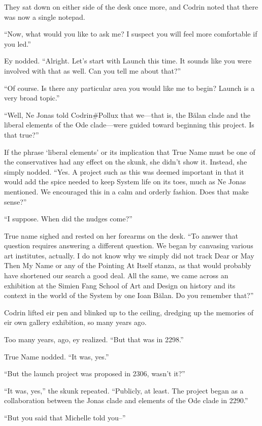 They sat down on either side of the desk once more, and Codrin noted that there was now a single notepad.

``Now, what would you like to ask me? I suspect you will feel more comfortable if you led.''

Ey nodded. ``Alright. Let's start with Launch this time. It sounds like you were involved with that as well. Can you tell me about that?''

``Of course. Is there any particular area you would like me to begin? Launch is a very broad topic.''

``Well, Ne Jonas told Codrin\#Pollux that we---that is, the Bălan clade and the liberal elements of the Ode clade---were guided toward beginning this project. Is that true?''

If the phrase `liberal elements' or its implication that True Name must be one of the conservatives had any effect on the skunk, she didn't show it. Instead, she simply nodded. ``Yes. A project such as this was deemed important in that it would add the spice needed to keep System life on its toes, much as Ne Jonas mentioned. We encouraged this in a calm and orderly fashion. Does that make sense?''

``I suppose. When did the nudges come?''

True name sighed and rested on her forearms on the desk. ``To answer that question requires answering a different question. We began by canvasing various art institutes, actually. I do not know why we simply did not track Dear or May Then My Name or any of the Pointing At Itself stanza, as that would probably have shortened our search a good deal. All the same, we came across an exhibition at the Simien Fang School of Art and Design on history and its context in the world of the System by one Ioan Bălan. Do you remember that?''

Codrin lifted eir pen and blinked up to the ceiling, dredging up the memories of eir own gallery exhibition, so many years ago.

Too many years, ago, ey realized. ``But that was in 2298.''

True Name nodded. ``It was, yes.''

``But the launch project was proposed in 2306, wasn't it?''

``It was, yes,'' the skunk repeated. ``Publicly, at least. The project began as a collaboration between the Jonas clade and elements of the Ode clade in 2290.''

``But you said that Michelle told you--''

